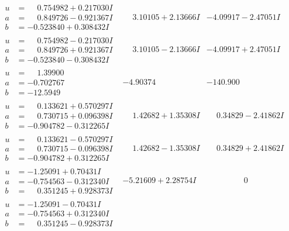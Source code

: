 \documentclass[1p]{elsarticle_modified}
\theoremstyle{definition}
\begin{document}
$$\begin{array}{c|c|c}
\begin{aligned}
u &= \phantom{-}0.754982 + 0.217030 I \\
a &= \phantom{-}0.849726 - 0.921367 I \\
b &= -0.523840 + 0.308432 I\end{aligned}
 & \phantom{-}3.10105 + 2.13666 I & -4.09917 - 2.47051 I \\ \hline\begin{aligned}
u &= \phantom{-}0.754982 - 0.217030 I \\
a &= \phantom{-}0.849726 + 0.921367 I \\
b &= -0.523840 - 0.308432 I\end{aligned}
 & \phantom{-}3.10105 - 2.13666 I & -4.09917 + 2.47051 I \\ \hline\begin{aligned}
u &= \phantom{-}1.39900\phantom{ +0.000000I} \\
a &= -0.702767\phantom{ +0.000000I} \\
b &= -12.5949\phantom{ +0.000000I}\end{aligned}
 & -4.90374\phantom{ +0.000000I} & -140.900\phantom{ +0.000000I} \\ \hline\begin{aligned}
u &= \phantom{-}0.133621 + 0.570297 I \\
a &= \phantom{-}0.730715 + 0.096398 I \\
b &= -0.904782 - 0.312265 I\end{aligned}
 & \phantom{-}1.42682 + 1.35308 I & \phantom{-}0.34829 - 2.41862 I \\ \hline\begin{aligned}
u &= \phantom{-}0.133621 - 0.570297 I \\
a &= \phantom{-}0.730715 - 0.096398 I \\
b &= -0.904782 + 0.312265 I\end{aligned}
 & \phantom{-}1.42682 - 1.35308 I & \phantom{-}0.34829 + 2.41862 I \\ \hline\begin{aligned}
u &= -1.25091 + 0.70431 I \\
a &= -0.754563 - 0.312340 I \\
b &= \phantom{-}0.351245 + 0.928373 I\end{aligned}
 & -5.21609 + 2.28754 I & \phantom{-0.000000 } 0 \\ \hline\begin{aligned}
u &= -1.25091 - 0.70431 I \\
a &= -0.754563 + 0.312340 I \\
b &= \phantom{-}0.351245 - 0.928373 I\end{aligned}

\end{array}$$
\end{document}

